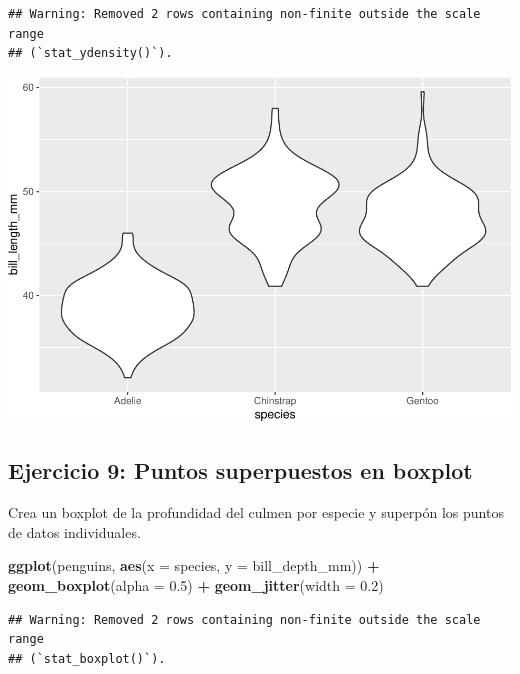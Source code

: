 \documentclass[
]{book}
\newenvironment{Shaded}{\begin{snugshade}}{\end{snugshade}}
\newcommand{\AttributeTok}[1]{\textcolor[rgb]{0.13,0.29,0.53}{#1}}
\newcommand{\FloatTok}[1]{\textcolor[rgb]{0.00,0.00,0.81}{#1}}
\newcommand{\FunctionTok}[1]{\textcolor[rgb]{0.13,0.29,0.53}{\textbf{#1}}}
\newcommand{\NormalTok}[1]{#1}
\newcommand{\SpecialCharTok}[1]{\textcolor[rgb]{0.81,0.36,0.00}{\textbf{#1}}}
\begin{document}
\begin{verbatim}
## Warning: Removed 2 rows containing non-finite outside the scale range
## (`stat_ydensity()`).
\end{verbatim}

\includegraphics{bookdown-demo_files/figure-latex/unnamed-chunk-207-1.pdf}

\hypertarget{ejercicio-9-puntos-superpuestos-en-boxplot-1}{%
\subsection{Ejercicio 9: Puntos superpuestos en boxplot}\label{ejercicio-9-puntos-superpuestos-en-boxplot-1}}

Crea un boxplot de la profundidad del culmen por especie y superpón los puntos de datos individuales.

\begin{Shaded}
\begin{Highlighting}[]
\FunctionTok{ggplot}\NormalTok{(penguins, }\FunctionTok{aes}\NormalTok{(}\AttributeTok{x =}\NormalTok{ species, }\AttributeTok{y =}\NormalTok{ bill\_depth\_mm)) }\SpecialCharTok{+}
  \FunctionTok{geom\_boxplot}\NormalTok{(}\AttributeTok{alpha =} \FloatTok{0.5}\NormalTok{) }\SpecialCharTok{+}
  \FunctionTok{geom\_jitter}\NormalTok{(}\AttributeTok{width =} \FloatTok{0.2}\NormalTok{)}
\end{Highlighting}
\end{Shaded}

\begin{verbatim}
## Warning: Removed 2 rows containing non-finite outside the scale range
## (`stat_boxplot()`).
\end{verbatim}
\end{document}
